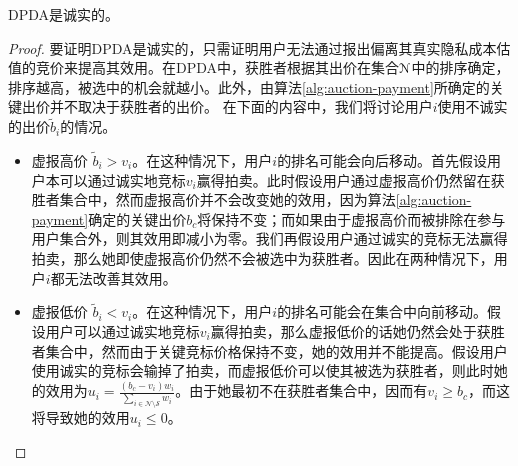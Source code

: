 	\begin{thm}\label{thm:tr}
		DPDA是诚实的。
	\end{thm} 
	\begin{proof}
		要证明DPDA是诚实的，只需证明用户无法通过报出偏离其真实隐私成本估值的竞价来提高其效用。在DPDA中，获胜者根据其出价在集合$\mathcal{N}$中的排序确定，排序越高，被选中的机会就越小。此外，由算法\ref{alg:auction-payment}所确定的关键出价并不取决于获胜者的出价。
		在下面的内容中，我们将讨论用户$i$使用不诚实的出价$\tilde{b}_i$的情况。
		\begin{itemize}
			\item 虚报高价 $\tilde{b}_i>v_i$。在这种情况下，用户$i$的排名可能会向后移动。首先假设用户本可以通过诚实地竞标$v_i$赢得拍卖。此时假设用户通过虚报高价仍然留在获胜者集合中，然而虚报高价并不会改变她的效用，因为算法\ref{alg:auction-payment}确定的关键出价$b_c$将保持不变；而如果由于虚报高价而被排除在参与用户集合外，则其效用即减小为零。我们再假设用户通过诚实的竞标无法赢得拍卖，那么她即使虚报高价仍然不会被选中为获胜者。因此在两种情况下，用户$i$都无法改善其效用。
			\item 虚报低价 $\tilde{b}_i<v_i$。在这种情况下，用户$i$的排名可能会在集合中向前移动。假设用户可以通过诚实地竞标$v_i$赢得拍卖，那么虚报低价的话她仍然会处于获胜者集合中，然而由于关键竞标价格保持不变，她的效用并不能提高。假设用户使用诚实的竞标会输掉了拍卖，而虚报低价可以使其被选为获胜者，则此时她的效用为$u_i=\frac{(b_{c}-v_i)w_i}{\sum_{i\in\mathcal{N}\setminus\mathcal{S}}w_i}$。由于她最初不在获胜者集合中，因而有$v_i\ge b_{c}$，而这将导致她的效用$u_i\le 0$。

\end{itemize}
\end{proof}
